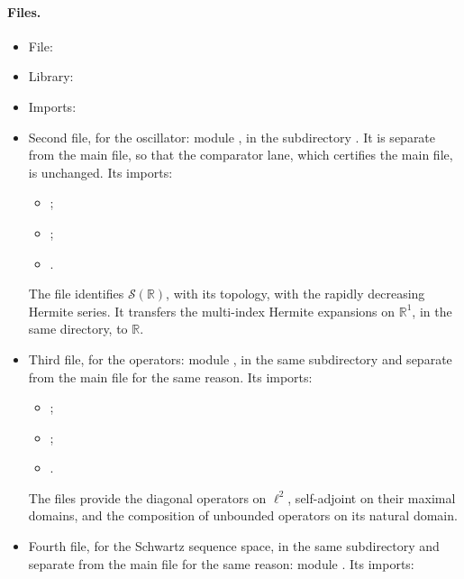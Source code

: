 \documentclass[11pt]{article}
\begin{document}
\paragraph{Files.}\leavevmode
\begin{itemize}
\item File: 
\item Library: 
\item Imports: 
\item Second file, for the oscillator: module , in the
  subdirectory . It is separate from the main file, so that the
  comparator lane, which certifies the main file, is unchanged. Its imports:
  \begin{itemize}
  \item {};
  \item {};
  \item {}.
  \end{itemize}
  The  file identifies $\mathcal{S}(\mathbb{R})$, with its topology, with the
  rapidly decreasing Hermite series. It transfers the multi-index Hermite expansions on
  $\mathbb{R}^1$, in the same directory, to $\mathbb{R}$.
\item Third file, for the operators: module , in
  the same subdirectory and separate from the main file for the same reason. Its imports:
  \begin{itemize}
  \item {};
  \item {};
  \item {}.
  \end{itemize}
  The  files provide the diagonal operators on $\ell^2$, self-adjoint on their
  maximal domains, and the composition of unbounded operators on its natural domain.
\item Fourth file, for the Schwartz sequence space, in the same subdirectory and separate from
  the main file for the same reason: module .
  Its imports:
  \begin{itemize}

\end{itemize}
\end{itemize}
\end{document}
